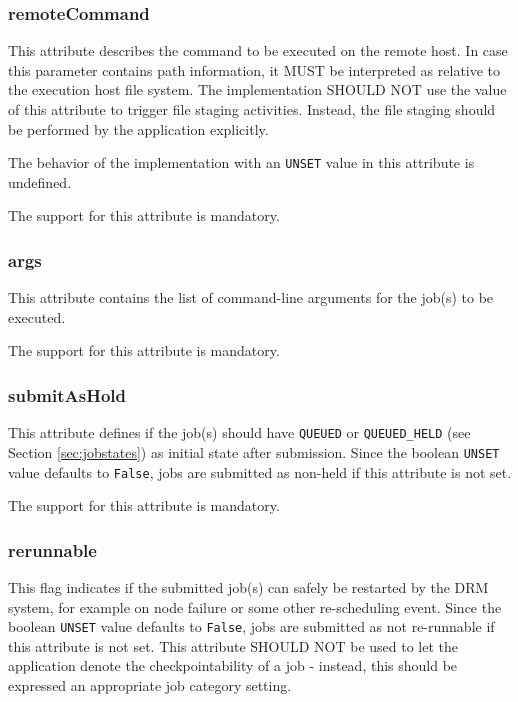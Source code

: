 \documentclass{article}
\newcommand{\h}[1]{\lstinline|#1|}
\begin{document}
\subsubsection{remoteCommand}

This attribute describes the command to be executed on the remote host. In case this parameter contains path information, it MUST be interpreted as relative to the execution host file system. The implementation SHOULD NOT use the value of this attribute to trigger file staging activities. Instead, the file staging should be performed by the application explicitly. 

The behavior of the implementation with an \h{UNSET} value in this attribute is undefined.

The support for this attribute is mandatory. 

\subsubsection{args}

This attribute contains the list of command-line arguments for the job(s) to be executed. 

The support for this attribute is mandatory.

\subsubsection{submitAsHold}

This attribute defines if the job(s) should have \h{QUEUED} or \h{QUEUED_HELD} (see Section \ref{sec:jobstates}) as initial state after submission. Since the boolean \h{UNSET} value defaults to \h{False}, jobs are submitted as non-held if this attribute is not set. 

The support for this attribute is mandatory.

\subsubsection{rerunnable}

This flag indicates if the submitted job(s) can safely be restarted by the DRM system, for example on node failure or some other re-scheduling event. Since the boolean \h{UNSET} value defaults to \h{False}, jobs are submitted as not re-runnable if this attribute is not set. This attribute SHOULD NOT be used to let the application denote the checkpointability of a job - instead, this should be expressed an appropriate job category setting.
\end{document}
